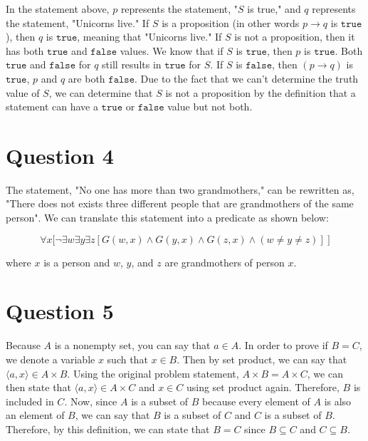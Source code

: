\documentclass[letterpaper, 12pt]{article}
\begin{document}
In the statement above, $p$ represents the statement, "$S$ is true," and $q$ represents the statement, "Unicorns live." If $S$ is a proposition (in other words $p \to q$ is $\texttt{true}$), then $q$ is $\texttt{true}$, meaning that "Unicorns live." If $S$ is not a proposition, then it has both $\texttt{true}$ and $\texttt{false}$ values. We know that if $S$ is $\texttt{true}$, then $p$ is $\texttt{true}$. Both $\texttt{true}$ and $\texttt{false}$ for $q$ still results in $\texttt{true}$ for $S$. If $S$ is $\texttt{false}$, then $(p \to q)$ is $\texttt{true}$, $p$ and $q$ are both $\texttt{false}$. Due to the fact that we can't determine the truth value of $S$, we can determine that $S$ is not a proposition by the definition that a statement can have a $\texttt{true}$ or $\texttt{false}$ value but not both.

\section*{Question 4}
The statement, "No one has more than two grandmothers," can be rewritten as, "There does not exists three different people that are grandmothers of the same person". We can translate this statement into a predicate as shown below:

\[
\forall x \Bigg[ \neg \exists w \exists y \exists z [ G(w,x) \land G(y,x) \land G(z,x) \land (w \neq y \neq z)] \> \Bigg]
\]

where $x$ is a person and $w$, $y$, and $z$ are grandmothers of person $x$.

\section*{Question 5}
Because $A$ is a nonempty set, you can say that $a \in A$. In order to prove if $B = C$, we denote a variable $x$ such that $x \in B$. Then by set product, we can say that $\langle a,x \rangle \in A \times B$. Using the original problem statement, $A \times B = A \times C$, we can then state that $\langle a,x \rangle \in A \times C$ and $x \in C$ using set product again. Therefore, $B$ is included in $C$. Now, since $A$ is a subset of $B$ because every element of $A$ is also an element of $B$, we can say that $B$ is a subset of $C$ and $C$ is a subset of $B$. Therefore, by this definition, we can state that $B = C$ since $B \subseteq C$ and $C \subseteq B$.
\end{document}
